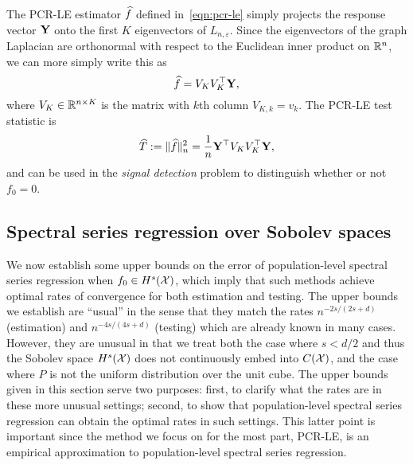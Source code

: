 The PCR-LE estimator $\widehat{f}$ defined in~\eqref{eqn:pcr-le} simply projects the response vector ${\bf Y}$ onto the first $K$ eigenvectors of $L_{n,\varepsilon}$. Since the eigenvectors of the graph Laplacian are orthonormal with respect to the Euclidean inner product on $\mathbb{R}^n$, we can more simply write this as
\begin{equation}
\label{eqn:laplacian_eigenmaps_estimator}
\widehat{f} = V_K V_K^{\top} {\bf Y},
\end{equation} 
where $V_K \in \mathbb{R}^{n \times K}$ is the matrix with $k$th column $V_{K,k} = v_k$. The PCR-LE test statistic is 
\begin{equation}
\label{eqn:laplacian_eigenmaps_test}
\widehat{T} := \|\widehat{f}\|_n^2 = \frac{1}{n} {\bf Y}^{\top} V_K V_K^{\top} {\bf Y},
\end{equation}
and can be used in the \emph{signal detection} problem to distinguish whether or not $f_0 = 0$.

\subsection{Spectral series regression over Sobolev spaces}
\label{subsec:spectral_projection}
We now establish some upper bounds on the error of population-level spectral series regression when $f_0 \in H^s(\mathcal{X})$, which imply that such methods achieve optimal rates of convergence for both estimation and testing. The upper bounds we establish are ``usual'' in the sense that they match the rates $n^{-2s/(2s + d)}$ (estimation) and $n^{-4s/(4s + d)}$ (testing) which are already known in many cases. However, they are unusual in that we treat both the case where $s < d/2$ and thus the Sobolev space $H^s(\mathcal{X})$ does not continuously embed into $C(\mathcal{X})$, and the case where $P$ is not the uniform distribution over the unit cube. The upper bounds given in this section serve two purposes: first, to clarify what the rates are in these more unusual settings; second, to show that population-level spectral series regression can obtain the optimal rates in such settings. This latter point is important since the method we focus on for the most part, PCR-LE, is an empirical approximation to population-level spectral series regression.

